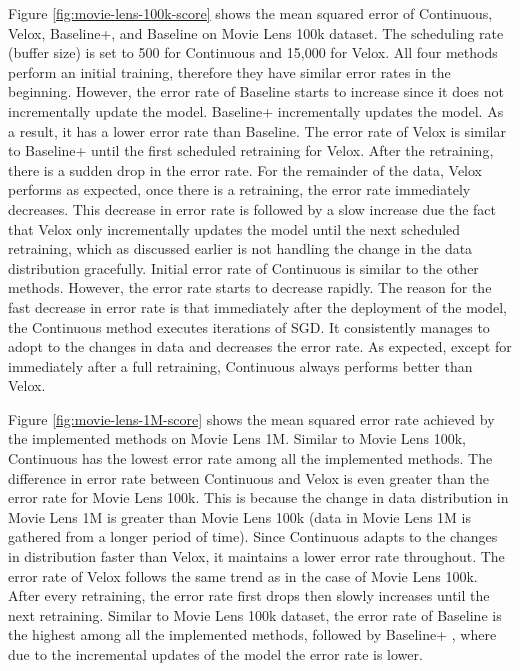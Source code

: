 \documentclass{vldb}
\begin{document}
Figure \ref{fig:movie-lens-100k-score} shows the mean squared error of Continuous, Velox, Baseline+, and Baseline on Movie Lens 100k dataset.
The scheduling rate (buffer size) is set to 500 for Continuous and 15,000 for Velox.
All four methods perform an initial training, therefore they have similar error rates in the beginning.
However, the error rate of Baseline starts to increase since it does not incrementally update the model.
Baseline+ incrementally updates the model.
As a result, it has a lower error rate than Baseline.
The error rate of Velox is similar to Baseline+ until the first scheduled retraining for Velox.
After the retraining, there is a sudden drop in the error rate.
For the remainder of the data, Velox performs as expected, once there is a retraining, the error rate immediately decreases.
This decrease in error rate is followed by a slow increase due the fact that Velox only incrementally updates the model until the next scheduled retraining, which as discussed earlier is not handling the change in the data distribution gracefully.
Initial error rate of Continuous is similar to the other methods.
However, the error rate starts to decrease rapidly.
The reason for the fast decrease in error rate is that immediately after the deployment of the model, the Continuous method executes iterations of SGD.
It consistently manages to adopt to the changes in data and decreases the error rate.
As expected, except for immediately after a full retraining, Continuous always performs better than Velox.

Figure \ref{fig:movie-lens-1M-score} shows the mean squared error rate achieved by the implemented methods on Movie Lens 1M.
Similar to Movie Lens 100k, Continuous has the lowest error rate among all the implemented methods.
The difference in error rate between Continuous and Velox is even greater than the error rate for Movie Lens 100k.
This is because the change in data distribution in Movie Lens 1M is greater than Movie Lens 100k (data in Movie Lens 1M is gathered from a longer period of time).
Since Continuous adapts to the changes in distribution faster than Velox, it maintains a lower error rate throughout.
The error rate of Velox follows the same trend as in the case of Movie Lens 100k. 
After every retraining, the error rate first drops then slowly increases until the next retraining.
Similar to Movie Lens 100k dataset, the error rate of Baseline is the highest among all the implemented methods, followed by Baseline+ , where due to the incremental updates of the model the error rate is lower.
\end{document}
